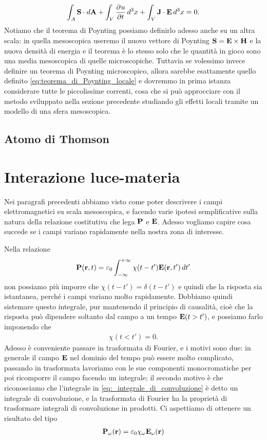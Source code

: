 \begin{align}
  \int_A \mathbf{S} \cdot d\mathbf{A} + \int_V \frac{\partial^{} {u}}{\partial {t}^{}}\, d^3x + \int_V \mathbf{J \cdot E} \,d^3x = 0.
\end{align}
Notiamo che il teorema di Poynting possiamo definirlo adesso anche su un altra scala: in quella mesoscopica useremo il nuovo vettore di Poynting 
$ \mathbf{S} = \mathbf{E \times H} $ e la nuova densità di energia e il teorema è lo stesso solo che le quantità in gioco sono una media mesoscopica di quelle 
microscopiche. Tuttavia se volessimo invece definire un teorema di Poynting microscopico, allora sarebbe esattamente quello definito 
\ref{eq:teorema_di_Poynting_locale} e dovremmo in prima istanza considerare tutte le piccolissime correnti, cosa che si può approcciare con il metodo 
sviluppato nella sezione precedente studiando gli effetti locali tramite un modello di una sfera mesoscopica.


\subsection{Atomo di Thomson}


\section{Interazione luce-materia}
Nei paragrafi precedenti abbiamo visto come poter descrivere i campi elettromagnetici su scala mesoscopica, e facendo varie ipotesi semplificative sulla 
natura della relazione costitutiva che lega $ \mathbf{P} $ e $ \mathbf{E} $. Adesso vogliamo capire cosa succede se i campi variano rapidamente nella nostra zona di 
interesse.

Nella relazione 
\begin{align} \label{eq:_integrale_di_convoluzione}
  \mathbf{P}(\mathbf{r}, t) = \varepsilon_0 \int_{-\infty}^{+\infty} \chi( t-t') \mathbf{E}(\mathbf{r}, t') \, dt'
\end{align}
non possiamo più imporre che $ \chi( t - t') = \delta( t - t') $ e quindi che la risposta sia istantanea, perché i campi variano molto rapidamente. Dobbiamo 
quindi sistemare questo integrale, pur mantenendo il principio di causalità, cioè che la risposta può dipendere soltanto dal campo a un tempo 
$ \mathbf{E}( t > t') $, e possiamo farlo imponendo che
\begin{align}
  \chi( t < t') = 0.
\end{align}
Adesso è conveniente passare in trasformata di Fourier, e i motivi sono due: in generale il campo $ \mathbf{E} $ nel dominio del tempo può essere molto 
complicato, passando in trasformata lavoriamo con le sue componenti monocromatiche per poi ricomporre il campo facendo un integrale; il secondo motivo è 
che riconosciamo che l'integrale in \eqref{eq:_integrale_di_convoluzione} è detto un integrale di convoluzione, e la trasformata di Fourier ha la proprietà 
di trasformare integrali di convoluzione in prodotti. Ci aspettiamo di ottenere un risultato del tipo 
\begin{align}
  \mathbf{P}_\omega(\mathbf{r}) = \varepsilon_0 \chi_\omega \mathbf{E}_\omega(\mathbf{r})
\end{align}

